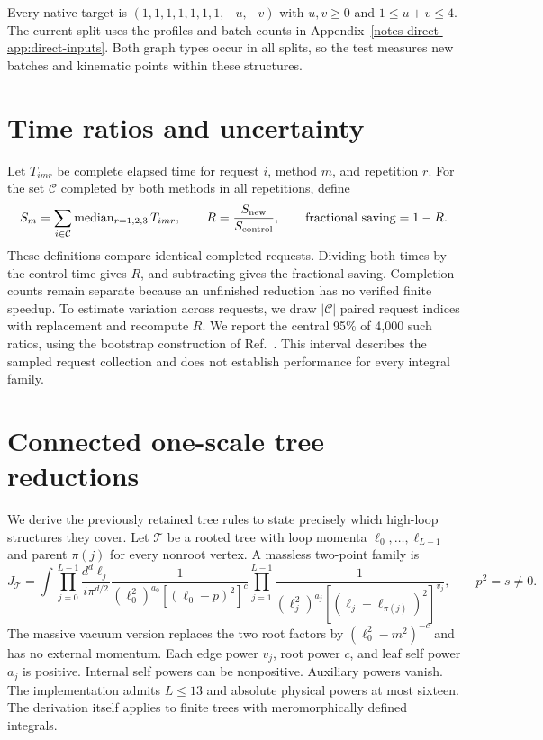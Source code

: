 \documentclass[11pt,a4paper]{article}
\begin{document}
Every native target is $(1,1,1,1,1,1,1,-u,-v)$ with $u,v\geq0$ and $1\leq u+v\leq4$. The current split uses the profiles and batch counts in Appendix~\ref{notes-direct-app:direct-inputs}. Both graph types occur in all splits, so the test measures new batches and kinematic points within these structures.

\section{Time ratios and uncertainty}
\label{notes-direct-app:statistics}
Let $T_{imr}$ be complete elapsed time for request $i$, method $m$, and repetition $r$. For the set $\mathcal C$ completed by both methods in all repetitions, define
\begin{equation}
 S_m=\sum_{i\in\mathcal C}\operatorname{median}_{r=1,2,3}T_{imr},\qquad
 R=\frac{S_{\rm new}}{S_{\rm control}},\qquad
 \text{fractional saving}=1-R.
 \label{notes-direct-eq:time-ratio}
\end{equation}
These definitions compare identical completed requests. Dividing both times by the control time gives $R$, and subtracting gives the fractional saving. Completion counts remain separate because an unfinished reduction has no verified finite speedup. To estimate variation across requests, we draw $|\mathcal C|$ paired request indices with replacement and recompute $R$. We report the central 95\% of 4,000 such ratios, using the bootstrap construction of Ref.~\cite{Efron1979}. This interval describes the sampled request collection and does not establish performance for every integral family.

\section{Connected one-scale tree reductions}
\label{notes-direct-app:trees}
We derive the previously retained tree rules to state precisely which high-loop structures they cover. Let $\mathcal T$ be a rooted tree with loop momenta $\ell_0,\ldots,\ell_{L-1}$ and parent $\pi(j)$ for every nonroot vertex. A massless two-point family is
\begin{equation}
 J_{\mathcal T}=\int\prod_{j=0}^{L-1}\frac{d^d\ell_j}{i\pi^{d/2}}
 \frac{1}{(\ell_0^2)^{a_0}[(\ell_0-p)^2]^c}
 \prod_{j=1}^{L-1}\frac{1}{(\ell_j^2)^{a_j}
 [ (\ell_j-\ell_{\pi(j)})^2]^{v_j}},\qquad p^2=s\ne0.
 \label{notes-direct-eq:tree-family}
\end{equation}
The massive vacuum version replaces the two root factors by $(\ell_0^2-m^2)^{-c}$ and has no external momentum. Each edge power $v_j$, root power $c$, and leaf self power $a_j$ is positive. Internal self powers can be nonpositive. Auxiliary powers vanish. The implementation admits $L\leq13$ and absolute physical powers at most sixteen. The derivation itself applies to finite trees with meromorphically defined integrals.
\end{document}
